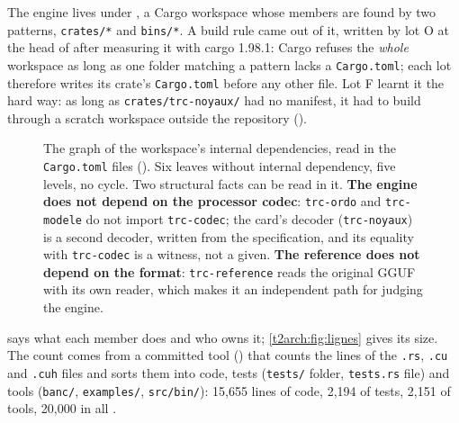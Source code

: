 The engine lives under , a Cargo workspace whose members are found by two patterns, \texttt{crates/*} and \texttt{bins/*}. A build rule came out of it, written by lot O at the head of  after measuring it with cargo 1.98.1: Cargo refuses the \emph{whole} workspace as long as one folder matching a pattern lacks a \texttt{Cargo.toml}; each lot therefore writes its crate's \texttt{Cargo.toml} before any other file. Lot F learnt it the hard way: as long as \texttt{crates/trc-noyaux/} had no manifest, it had to build through a scratch workspace outside the repository ().

\begin{figure}[p]
\centering
\TdArchCaisses
\caption[The graph of internal dependencies]{The graph of the workspace's internal dependencies, read in the \texttt{Cargo.toml} files (). Six leaves without internal dependency, five levels, no cycle. Two structural facts can be read in it. \textbf{The engine does not depend on the processor codec}: \texttt{trc-ordo} and \texttt{trc-modele} do not import \texttt{trc-codec}; the card's decoder (\texttt{trc-noyaux}) is a second decoder, written from the specification, and its equality with \texttt{trc-codec} is a witness, not a given. \textbf{The reference does not depend on the format}: \texttt{trc-reference} reads the original GGUF with its own reader, which makes it an independent path for judging the engine.}
\label{t2arch:fig:caisses}
\end{figure}

 says what each member does and who owns it; \cref{t2arch:fig:lignes} gives its size. The count comes from a committed tool () that counts the lines of the \texttt{.rs}, \texttt{.cu} and \texttt{.cuh} files and sorts them into code, tests (\texttt{tests/} folder, \texttt{tests.rs} file) and tools (\texttt{banc/}, \texttt{examples/}, \texttt{src/bin/}): 15{,}655 lines of code, 2{,}194 of tests, 2{,}151 of tools, 20{,}000 in all \calc.

